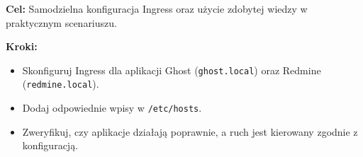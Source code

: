 \documentclass{article}
\begin{document}
\textbf{Cel:} Samodzielna konfiguracja Ingress oraz użycie zdobytej wiedzy w praktycznym scenariuszu.

\textbf{Kroki:}
\begin{itemize}
    \item Skonfiguruj Ingress dla aplikacji Ghost (\texttt{ghost.local}) oraz Redmine (\texttt{redmine.local}).
    \item Dodaj odpowiednie wpisy w \texttt{/etc/hosts}.
    \item Zweryfikuj, czy aplikacje działają poprawnie, a ruch jest kierowany zgodnie z konfiguracją.
\end{itemize}
\end{document}
